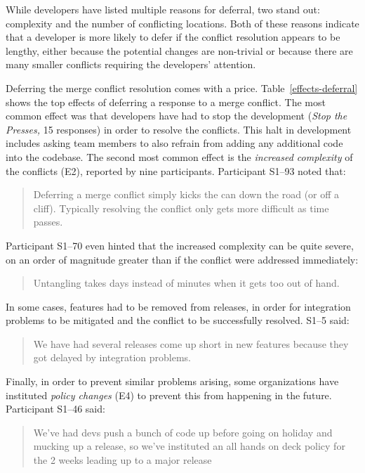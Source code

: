 While developers have listed multiple reasons for deferral, two stand out: complexity and the number of conflicting locations.
Both of these reasons indicate that a developer is more likely to defer if the conflict resolution appears to be lengthy, either because the potential changes are non-trivial or because there are many smaller conflicts requiring the developers' attention.

Deferring the merge conflict resolution comes with a price.
Table~\ref{effects-deferral} shows the top effects of deferring a response to a merge conflict.
The most common effect was that developers have had to stop the development (\emph{Stop the Presses,} 15 responses) in order to resolve the conflicts.
This halt in development includes asking team members to also refrain from adding any additional code into the codebase.
The second most common effect is the \textit{increased complexity} of the conflicts (E2), reported by nine participants.
Participant S1--93 noted that:
\begin{quotation}
	Deferring a merge conflict simply kicks the can down the road (or off a cliff). Typically resolving the conflict only gets more difficult as time passes.
\end{quotation}
Participant S1--70 even hinted that the increased complexity can be quite severe, on an order of magnitude greater than if the conflict were addressed immediately:
\begin{quotation}
	Untangling takes days instead of minutes when it gets too out of hand.
\end{quotation}
In some cases, features had to be removed from releases, in order for integration problems to be mitigated and the conflict to be successfully resolved. S1--5 said:
\begin{quotation}
	We have had several releases come up short in new features because they got delayed by integration problems.
\end{quotation}
Finally, in order to prevent similar problems arising, some organizations have instituted \textit{policy changes} (E4) to prevent this from happening in the future. Participant S1--46 said:
\begin{quotation}
	We've had devs push a bunch of code up before going on holiday and mucking up a release, so we've instituted an all hands on deck policy for the 2 weeks leading up to a major release
\end{quotation}

